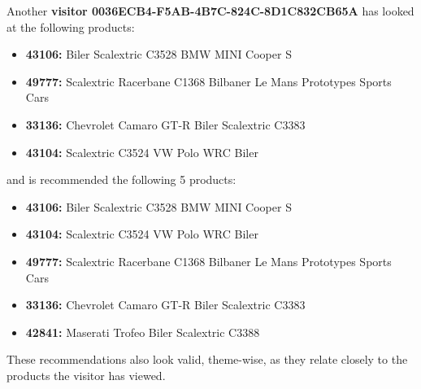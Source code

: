 Another \textbf{visitor 0036ECB4-F5AB-4B7C-824C-8D1C832CB65A} has looked at the following products:
\begin{itemize}
\item \textbf{43106: }Biler Scalextric C3528 BMW MINI Cooper S
\item \textbf{49777: }Scalextric Racerbane C1368 Bilbaner Le Mans Prototypes Sports Cars
\item \textbf{33136: }Chevrolet Camaro GT-R Biler Scalextric C3383 
\item \textbf{43104: }Scalextric C3524 VW Polo WRC Biler
\end{itemize}
and is recommended the following 5 products:
\begin{itemize}
\item \textbf{43106: }Biler Scalextric C3528 BMW MINI Cooper S
\item \textbf{43104: }Scalextric C3524 VW Polo WRC Biler
\item \textbf{49777: }Scalextric Racerbane C1368 Bilbaner Le Mans Prototypes Sports Cars
\item \textbf{33136: }Chevrolet Camaro GT-R Biler Scalextric C3383
\item \textbf{42841: }Maserati Trofeo Biler Scalextric C3388
\end{itemize}

These recommendations also look valid, theme-wise, as they relate closely to the products the visitor has viewed. \\\\

